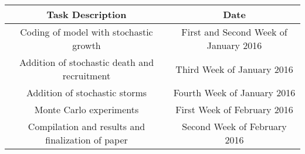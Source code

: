 \documentclass[14pt,letterpaper]{article}
\begin{document}
\begin{tabular}{|c|c|}
\hline
Task Description & Date \\
\hline
Coding of model with stochastic growth & First and Second Week of January 2016\\
\hline
Addition of stochastic death and recruitment & Third Week of January 2016\\
\hline
Addition of stochastic storms & Fourth Week of January 2016\\
\hline
Monte Carlo experiments & First Week of February 2016\\
\hline
Compilation and results and finalization of paper & Second Week of February 2016\\
\hline
\end{tabular}



\label{sect:bib}

\end{document}
